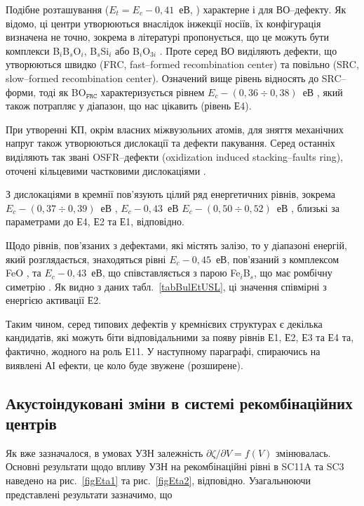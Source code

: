 Подібне розташування ($E_t=E_c-0,41$~еВ, \cite{LIDRev,LIDRev2,BO3i,Rein,LID:SchmidtJMR}) характерне і для ВО--дефекту.
Як відомо, ці центри утворюються внаслідок інжекції носіїв,
їх конфігурація визначена не точно, зокрема в літературі пропонується,
що це можуть бути комплекси B$_i$B$_s$O$_i$, B$_s$Si$_i$\cite{LIDRev} або
B$_i$O$_{3i}$ \cite{BO3i}.
Проте серед ВО виділяють дефекти,
що утворюються швидко (FRC, fast--formed recombination center)
та повільно (SRC, slow--formed recombination center).
Означений вище рівень відносять до SRC--форми,
тоді як  BO$_\mathtt{FRC}$ характеризується рівнем $E_c-(0,36\div0,38)$~еВ \cite{LIDRev2,BOSingle:SEMSS2017}, який
також потрапляє у діапазон, що нас цікавить (рівень Е4).

При утворенні КП, окрім власних міжвузольних атомів, для зняття механічних напруг також утворюються дислокації та дефекти пакування.
Серед останніх виділяють так звані OSFR--дефекти (oxidization induced stacking--faults ring), оточені кільцевими частковими дислокаціями \cite{MSER74,MSER28}.

З дислокаціями в кремнії пов'язують цілий ряд енергетичних рівнів, зокрема
$E_c-(0,37\div0,39)$~еВ \cite{PhysRevB56:10208,kveder2008,SiO:Hwang,disl10:Isakova,Kittler2003},
$E_c-0,43$~еВ \cite{PhysRevB56:10208,SiO:Vanhell}
$E_c-(0,50\div0,52)$~еВ \cite{Edis:Ogawa,Edis:Omling,Kittler2003},
близькі за параметрами до Е4, Е2 та Е1, відповідно.

Щодо рівнів, пов'язаних з дефектами, які містять залізо, то у діапазоні енергій, який розглядається,
знаходяться рівні $E_c-0,45$~еВ, пов'язаний з комплексом FeO \cite{FeO},
та $E_c-0,43$~еВ, що співставляється з парою Fe$_i$B$_s$, що має ромбічну симетрію \cite{FeB:PhysRevB49,Istratov1999}.
Як видно з даних табл.~\ref{tabBulEtUSL}, ці значення співмірні з енергією активації Е2.

Таким чином, серед типових дефектів у кремнієвих структурах є декілька кандидатів,
які можуть біти відповідальними за появу рівнів Е1, Е2, Е3 та Е4 та, фактично, жодного на роль Е11.
У наступному параграфі, спираючись на виявлені АІ ефекти, це коло буде звужене (розширене).

\subsection{Акустоіндуковані зміни в системі рекомбінаційних центрів\label{sbBul3}}

Як вже зазначалося, в умовах УЗН залежність $\partial \zeta/ \partial V = f (V)$ змінювалась.
Основні результати щодо впливу УЗН на рекомбінаційні рівні в SC11A та SC3 наведено
на рис.~\ref{figEta1} та рис.~\ref{figEta2}, відповідно.
Узагальнюючи представлені результати зазначимо, що


